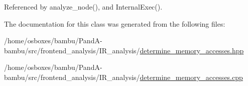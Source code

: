 Referenced by analyze\+\_\+node(), and Internal\+Exec().



The documentation for this class was generated from the following files\+:\begin{DoxyCompactItemize}
\item 
/home/osboxes/bambu/\+Pand\+A-\/bambu/src/frontend\+\_\+analysis/\+I\+R\+\_\+analysis/\hyperlink{determine__memory__accesses_8hpp}{determine\+\_\+memory\+\_\+accesses.\+hpp}\item 
/home/osboxes/bambu/\+Pand\+A-\/bambu/src/frontend\+\_\+analysis/\+I\+R\+\_\+analysis/\hyperlink{determine__memory__accesses_8cpp}{determine\+\_\+memory\+\_\+accesses.\+cpp}\end{DoxyCompactItemize}
